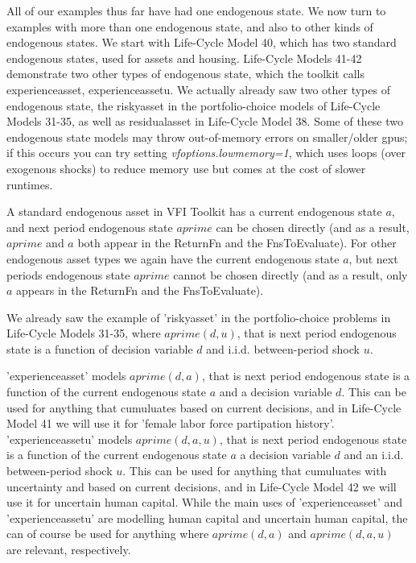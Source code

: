 All of our examples thus far have had one endogenous state. We now turn to examples with more than one endogenous state, and also to other kinds of endogenous states. We start with Life-Cycle Model 40, which has two standard endogenous states, used for assets and housing. Life-Cycle Models 41-42 demonstrate two other types of endogenous state, which the toolkit calls experienceasset, experienceassetu.
We actually already saw two other types of endogenous state, the riskyasset in the portfolio-choice models of Life-Cycle Models 31-35, as well as residualasset in Life-Cycle Model 38. Some of these two endogenous state models may throw out-of-memory errors on smaller/older gpus; if this occurs you can try setting \textit{vfoptions.lowmemory=1}, which uses loops (over exogenous shocks) to reduce memory use but comes at the cost of slower runtimes.

A standard endogenous asset in VFI Toolkit has a current endogenous state $a$, and next period endogenous state $aprime$ can be chosen directly (and as a result, $aprime$ and $a$ both appear in the ReturnFn and the FnsToEvaluate). For other endogenous asset types we again have the current endogenous state $a$, but next periods endogenous state $aprime$ cannot be chosen directly (and as a result, only $a$ appears in the ReturnFn and the FnsToEvaluate).

We already saw the example of 'riskyasset' in the portfolio-choice problems in Life-Cycle Models 31-35, where $aprime(d,u)$, that is next period endogenous state is a function of decision variable $d$ and i.i.d. between-period shock $u$.

'experienceasset' models $aprime(d,a)$, that is next period endogenous state is a function of the current endogenous state $a$ and a decision variable $d$. This can be used for anything that cumuluates based on current decisions, and in Life-Cycle Model 41 we will use it for 'female labor force partipation history'. 'experienceassetu' models $aprime(d,a,u)$, that is next period endogenous state is a function of the current endogenous state $a$ a decision variable $d$ and an i.i.d. between-period shock $u$. This can be used for anything that cumuluates with uncertainty and based on current decisions, and in Life-Cycle Model 42 we will use it for uncertain human capital. While the main uses of 'experienceasset' and 'experienceassetu' are modelling human capital and uncertain human capital, the can of course be used for anything where $aprime(d,a)$ and $aprime(d,a,u)$ are relevant, respectively.


